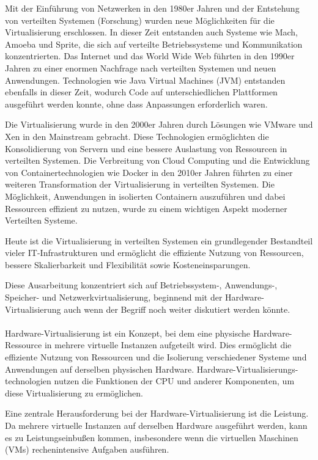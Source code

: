 Mit der Einführung von Netzwerken in den 1980er Jahren und der Entstehung von verteilten Systemen (Forschung) wurden neue Möglichkeiten für die Virtualisierung erschlossen. In dieser Zeit entstanden auch Systeme wie Mach, Amoeba und Sprite, die sich auf verteilte Betriebssysteme und Kommunikation konzentrierten. Das Internet und das World Wide Web führten in den 1990er Jahren zu einer enormen Nachfrage nach verteilten Systemen und neuen Anwendungen. Technologien wie Java Virtual Machines (JVM) entstanden ebenfalls in dieser Zeit, wodurch Code auf unterschiedlichen Plattformen ausgeführt werden konnte, ohne dass Anpassungen erforderlich waren.

Die Virtualisierung wurde in den 2000er Jahren durch Lösungen wie VMware und Xen in den Mainstream gebracht. Diese Technologien ermöglichten die Konsolidierung von Servern und eine bessere Auslastung von Ressourcen in verteilten Systemen. Die Verbreitung von Cloud Computing und die Entwicklung von Containertechnologien wie Docker in den 2010er Jahren führten zu einer weiteren Transformation der Virtualisierung in verteilten Systemen. Die Möglichkeit, Anwendungen in isolierten Containern auszuführen und dabei Ressourcen effizient zu nutzen, wurde zu einem wichtigen Aspekt moderner Verteilten Systeme.

Heute ist die Virtualisierung in verteilten Systemen ein grundlegender Bestandteil vieler IT-Infrastrukturen und ermöglicht die effiziente Nutzung von Ressourcen, bessere Skalierbarkeit und Flexibilität sowie Kosteneinsparungen.

Diese Ausarbeitung konzentriert sich auf Betriebssystem-, Anwendungs-, Speicher- und Netzwerkvirtualisierung, beginnend mit der Hardware-Virtualisierung auch wenn der Begriff noch weiter diskutiert werden könnte. 
\\\\
Hardware-Virtualisierung ist ein Konzept, bei dem eine physische Hardware-Ressource in mehrere virtuelle Instanzen aufgeteilt wird. Dies ermöglicht die effiziente Nutzung von Ressourcen und die Isolierung verschiedener Systeme und Anwendungen auf derselben physischen Hardware. Hardware-Virtualisierungs-technologien nutzen die Funktionen der CPU und anderer Komponenten, um diese Virtualisierung zu ermöglichen.

Eine zentrale Herausforderung bei der Hardware-Virtualisierung ist die Leistung. Da mehrere virtuelle Instanzen auf derselben Hardware ausgeführt werden, kann es zu Leistungseinbußen kommen, insbesondere wenn die virtuellen Maschinen (VMs) rechenintensive Aufgaben ausführen.

